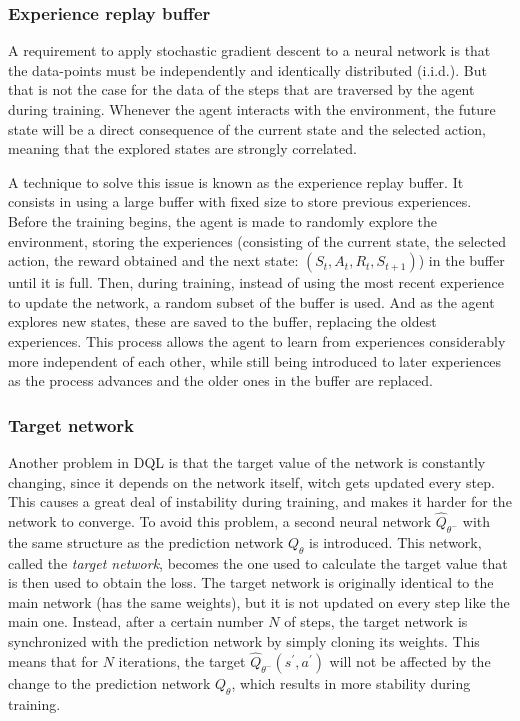 \subsubsection*{Experience replay buffer}

A requirement to apply stochastic gradient descent to a neural network is that the data-points must be independently and identically distributed (i.i.d.). But that is not the case for the data of the steps that are traversed by the agent during training. Whenever the agent interacts with the environment, the future state will be a direct consequence of the current state and the selected action, meaning that the explored states are strongly correlated.

A technique to solve this issue is known as the experience replay buffer. It consists in using a large buffer with fixed size to store previous experiences. Before the training begins, the agent is made to randomly explore the environment, storing the experiences (consisting of the current state, the selected action, the reward obtained and the next state: $(S_t, A_t, R_t, S_{t+1})$) in the buffer until it is full. Then, during training, instead of using the most recent experience to update the network, a random subset of the buffer is used. And as the agent explores new states, these are saved to the buffer, replacing the oldest experiences. This process allows the agent to learn from experiences considerably more independent of each other, while still being introduced to later experiences as the process advances and the older ones in the buffer are replaced.

\subsubsection*{Target network}

Another problem in DQL is that the target value of the network is constantly changing, since it depends on the network itself, witch gets updated every step. This causes a great deal of instability during training, and makes it harder for the network to converge. To avoid this problem, a second neural network $\hat{Q}_{\theta^-}$ with the same structure as the prediction network $Q_\theta$ is introduced. This network, called the \textit{target network}, becomes the one used to calculate the target value that is then used to obtain the loss. The target network is originally identical to the main network (has the same weights), but it is not updated on every step like the main one. Instead, after a certain number $N$ of steps, the target network is synchronized with the prediction network by simply cloning its weights. This means that for $N$ iterations, the target $\hat{Q}_{\theta^-}(s^\prime, a^\prime)$ will not be affected by the change to the prediction network $Q_\theta$, which results in more stability during training.

